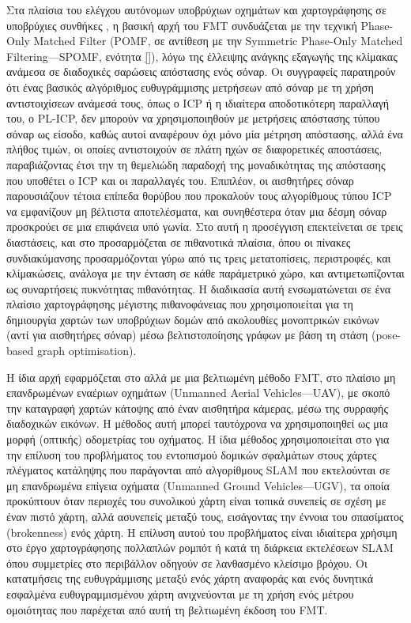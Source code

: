 Στα πλαίσια του ελέγχου αυτόνομων υποβρύχιων οχημάτων και χαρτογράφησης σε
υποβρύχιες συνθήκες \cite{Bulow2010}, η βασική αρχή του FMT συνδυάζεται με την
τεχνική Phase-Only Matched Filter (POMF, σε αντίθεση με την Symmetric
Phase-Only Matched Filtering---SPOMF, ενότητα \ref{}), λόγω της έλλειψης
ανάγκης εξαγωγής της κλίμακας ανάμεσα σε διαδοχικές σαρώσεις απόστασης ενός
σόναρ. Οι συγγραφείς παρατηρούν ότι ένας βασικός αλγόριθμος ευθυγράμμισης
μετρήσεων από σόναρ με τη χρήση αντιστοιχίσεων ανάμεσά τους, όπως ο ICP ή η
ιδιαίτερα αποδοτικότερη παραλλαγή του, ο PL-ICP, δεν μπορούν να χρησιμοποιηθούν
με μετρήσεις απόστασης τύπου σόναρ ως είσοδο, καθώς αυτοί αναφέρουν όχι μόνο
μία μέτρηση απόστασης, αλλά ένα πλήθος τιμών, οι οποίες αντιστοιχούν σε πλάτη
ηχών σε διαφορετικές αποστάσεις, παραβιάζοντας έτσι την τη θεμελιώδη παραδοχή
της μοναδικότητας της απόστασης που υποθέτει ο ICP και οι παραλλαγές του.
Επιπλέον, οι αισθητήρες σόναρ παρουσιάζουν τέτοια επίπεδα θορύβου που προκαλούν
τους αλγορίθμους τύπου ICP να εμφανίζουν μη βέλτιστα αποτελέσματα, και
συνηθέστερα όταν μια δέσμη σόναρ προσκρούει σε μια επιφάνεια υπό γωνία. Στο
\cite{Bulow2011} αυτή η προσέγγιση επεκτείνεται σε τρεις διαστάσεις, και στο
\cite{Pfingsthorn2010} προσαρμόζεται σε πιθανοτικά πλαίσια, όπου οι πίνακες
συνδιακύμανσης προσαρμόζονται γύρω από τις τρεις μετατοπίσεις, περιστροφές, και
κλίμακώσεις, ανάλογα με την ένταση σε κάθε παράμετρικό χώρο, και
αντιμετωπίζονται ως συναρτήσεις πυκνότητας πιθανότητας. Η διαδικασία αυτή
ενσωματώνεται σε ένα πλαίσιο χαρτογράφησης μέγιστης πιθανοφάνειας που
χρησιμοποιείται για τη δημιουργία χαρτών των υποβρύχιων δομών από ακολουθίες
μονοπτρικών εικόνων (αντί για αισθητήρες σόναρ) μέσω βελτιστοποίησης γράφων με
βάση τη στάση (pose-based graph optimisation).

Η ίδια αρχή εφαρμόζεται στο \cite{Bulow2009} αλλά με μια βελτιωμένη μέθοδο FMT,
στο πλαίσιο μη επανδρωμένων εναέριων οχημάτων (Unmanned Aerial Vehicles---UAV),
με σκοπό την καταγραφή χαρτών κάτοψης από έναν αισθητήρα κάμερας, μέσω της
συρραφής διαδοχικών εικόνων. Η μέθοδος αυτή μπορεί ταυτόχρονα να χρησιμοποιηθεί
ως μια μορφή (οπτικής) οδομετρίας του οχήματος. Η ίδια μέθοδος χρησιμοποιείται
στο \cite{Birk2010} για την επίλυση του προβλήματος του εντοπισμού δομικών
σφαλμάτων στους χάρτες πλέγματος κατάληψης που παράγονται από αλγορίθμους SLAM
που εκτελούνται σε μη επανδρωμένα επίγεια οχήματα (Unmanned Ground
Vehicles---UGV), τα οποία προκύπτουν όταν περιοχές του συνολικού χάρτη είναι
τοπικά συνεπείς σε σχέση με έναν πιστό χάρτη, αλλά ασυνεπείς μεταξύ τους,
εισάγοντας την έννοια του σπασίματος (brokenness) ενός χάρτη. Η επίλυση αυτού
του προβλήματος είναι ιδιαίτερα χρήσιμη στο έργο χαρτογράφησης πολλαπλών ρομπότ
ή κατά τη διάρκεια εκτελέσεων SLAM όπου συμμετρίες στο περιβάλλον οδηγούν σε
λανθασμένο κλείσιμο βρόχου. Οι κατατμήσεις της ευθυγράμμισης μεταξύ ενός χάρτη
αναφοράς και ενός δυνητικά εσφαλμένα ευθυγραμμισμένου χάρτη ανιχνεύονται με τη
χρήση ενός μέτρου ομοιότητας που παρέχεται από αυτή τη βελτιωμένη έκδοση του
FMT.

